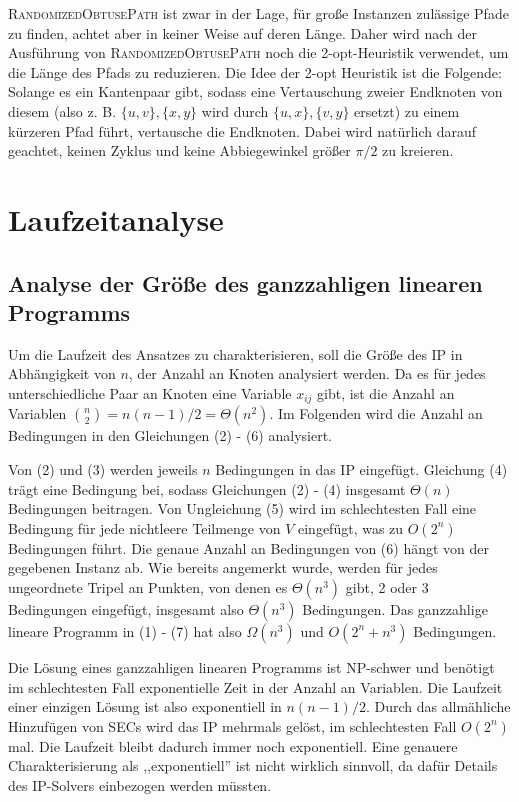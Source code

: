 \documentclass[a4paper, 10pt, ngerman]{article}
\begin{document}
\textsc{RandomizedObtusePath} ist zwar in der Lage, für große Instanzen zulässige Pfade zu finden, achtet aber in keiner Weise auf deren Länge. Daher wird nach der Ausführung von \textsc{RandomizedObtusePath} noch die 2-opt-Heuristik verwendet, um die Länge des Pfads zu reduzieren. Die Idee der 2-opt Heuristik ist die Folgende: Solange es ein Kantenpaar gibt, sodass eine Vertauschung zweier Endknoten von diesem (also z. B. $\{u, v\}, \{x, y\}$ wird durch $\{u, x\}, \{v, y\}$ ersetzt) zu einem kürzeren Pfad führt, vertausche die Endknoten. Dabei wird natürlich darauf geachtet, keinen Zyklus und keine Abbiegewinkel größer $\pi / 2$ zu kreieren.

\section{Laufzeitanalyse}

\subsection{Analyse der Größe des ganzzahligen linearen Programms}

Um die Laufzeit des Ansatzes zu charakterisieren, soll die Größe des IP in Abhängigkeit von $n$, der Anzahl an Knoten analysiert werden. Da es für jedes unterschiedliche Paar an Knoten eine Variable $x_{ij}$ gibt, ist die Anzahl an Variablen $\binom n 2 = n(n - 1) / 2 = \Theta(n^2)$. Im Folgenden wird die Anzahl an Bedingungen in den Gleichungen (2) - (6) analysiert.

Von (2) und (3) werden jeweils $n$ Bedingungen in das IP eingefügt. Gleichung (4) trägt eine Bedingung bei, sodass Gleichungen (2) - (4) insgesamt $\Theta(n)$ Bedingungen beitragen. Von Ungleichung (5) wird im schlechtesten Fall eine Bedingung für jede nichtleere Teilmenge von $V$ eingefügt, was zu $O(2^n)$ Bedingungen führt. Die genaue Anzahl an Bedingungen von (6) hängt von der gegebenen Instanz ab. Wie bereits angemerkt wurde, werden für jedes ungeordnete Tripel an Punkten, von denen es $\Theta(n^3)$ gibt, 2 oder 3 Bedingungen eingefügt, insgesamt also $\Theta(n^3)$ Bedingungen. Das ganzzahlige lineare Programm in (1) - (7) hat also $\Omega(n^3)$ und $O(2^n + n^3)$ Bedingungen.

Die Lösung eines ganzzahligen linearen Programms ist NP-schwer und benötigt im schlechtesten Fall exponentielle Zeit in der Anzahl an Variablen. Die Laufzeit einer einzigen Lösung ist also exponentiell in $n(n-1)/2$. Durch das allmähliche Hinzufügen von SECs wird das IP mehrmals gelöst, im schlechtesten Fall $O(2^n)$ mal. Die Laufzeit bleibt dadurch immer noch exponentiell. Eine genauere Charakterisierung als ,,exponentiell'' ist nicht wirklich sinnvoll, da dafür Details des IP-Solvers einbezogen werden müssten.
\end{document}
